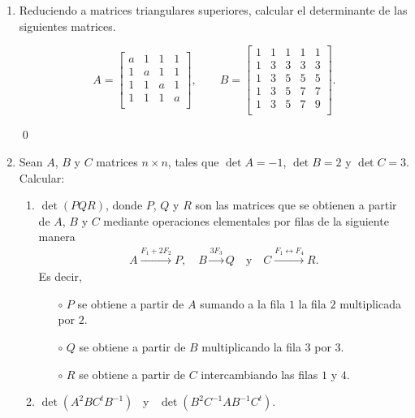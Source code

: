 \begin{enumerate}[topsep=6pt,itemsep=.4cm]
    \qed
    
    \item Reduciendo a matrices triangulares superiores, calcular el determinante de las siguientes matrices.
    
            $$A =
            \begin{bmatrix}
                a&1&1&1 \\
                1&a&1&1 \\
                1&1&a&1 \\
                1&1&1&a \\
            \end{bmatrix}, \qquad	
            B =
            \begin{bmatrix}
                1&1&1&1&1 \\
                1&3&3&3&3 \\
                1&3&5&5&5 \\
                1&3&5&7&7 \\
                1&3&5&7&9 \\
            \end{bmatrix}.
            $$
            \rta

            \qed

    \item Sean $A$, $B$ y $C$ matrices $n\times n$, tales que $\det A=-1$, $\det B=2$ y $\det C=3$.
    Calcular:
    
    \begin{enumerate}
    \item $\det(PQR)$, donde $P$, $Q$ y $R$ son las matrices que se obtienen a partir de $A$, $B$ y $C$ mediante operaciones elementales por filas de la siguiente manera
     \begin{align*}
     A\overset{F_1+2F_2}{\longrightarrow} P,\quad
     B\overset{3F_3}{\longrightarrow} Q
     \quad\mbox{y}\quad
     C\overset{F_1\leftrightarrow F_4}{\longrightarrow} R.
     \end{align*}
     Es decir,
     \begin{itemize}
      \item[$\circ$] $P$ se obtiene a partir de $A$ sumando a la fila $1$ la fila $2$ multiplicada por $2$.
      \item[$\circ$] $Q$ se obtiene a partir de $B$ multiplicando la fila $3$ por $3$.
      \item[$\circ$] $R$ se obtiene a partir de $C$ intercambiando las filas $1$ y $4$.
     \end{itemize}
        \item $\det(A^2BC^tB^{-1})$ \ y \ $\det(B^2C^{-1}AB^{-1}C^{t})$.
    \end{enumerate}
    \rta


\end{enumerate}
